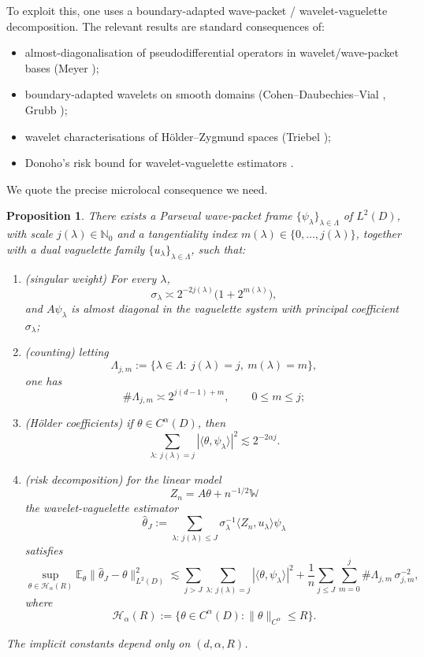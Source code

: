 \documentclass[11pt]{article}
\newtheorem{proposition}[theorem]{Proposition}
\newcommand{\E}{\mathbb E}
\begin{document}
To exploit this, one uses a boundary-adapted wave-packet / wavelet-vaguelette decomposition. The relevant results are standard consequences of:
\begin{itemize}
\item almost-diagonalisation of pseudodifferential operators in wavelet/wave-packet bases (Meyer \cite[Ch.~VI]{Meyer});
\item boundary-adapted wavelets on smooth domains (Cohen--Daubechies--Vial \cite{CDV}, Grubb \cite{Grubb});
\item wavelet characterisations of Hölder--Zygmund spaces (Triebel \cite[Ch.~2]{Triebel});
\item Donoho's risk bound for wavelet-vaguelette estimators \cite{Donoho95}.
\end{itemize}

We quote the precise microlocal consequence we need.

\begin{proposition}\label{prop:wvd}
There exists a Parseval wave-packet frame $\{\psi_\lambda\}_{\lambda\in \Lambda}$ of $L^2(D)$, with scale $j(\lambda)\in \mathbb N_0$ and a tangentiality index $m(\lambda)\in\{0,\dots,j(\lambda)\}$, together with a dual vaguelette family $\{u_\lambda\}_{\lambda\in\Lambda}$, such that:

\begin{enumerate}
\item[\rm(a)] (\emph{singular weight}) For every $\lambda$,
\[
\sigma_\lambda \asymp 2^{-2j(\lambda)}\bigl(1+2^{m(\lambda)}\bigr),
\]
and $A\psi_\lambda$ is almost diagonal in the vaguelette system with principal coefficient $\sigma_\lambda$;

\item[\rm(b)] (\emph{counting}) letting
\[
\Lambda_{j,m}:=\{\lambda\in\Lambda:\ j(\lambda)=j,\ m(\lambda)=m\},
\]
one has
\[
\#\Lambda_{j,m}\asymp 2^{j(d-1)+m},\qquad 0\le m\le j;
\]

\item[\rm(c)] (\emph{Hölder coefficients}) if $\theta\in C^\alpha(D)$, then
\[
\sum_{\lambda:\ j(\lambda)=j} |\langle \theta,\psi_\lambda\rangle|^2 \lesssim 2^{-2\alpha j}.
\]

\item[\rm(d)] (\emph{risk decomposition}) for the linear model
\[
Z_n=A\theta+n^{-1/2}\mathbb W
\]
the wavelet-vaguelette estimator
\[
\hat\theta_J:=\sum_{\lambda:\ j(\lambda)\le J}\sigma_\lambda^{-1}\langle Z_n,u_\lambda\rangle \psi_\lambda
\]
satisfies
\[
\sup_{\theta\in \mathcal H_\alpha(R)}
\E_\theta\|\hat\theta_J-\theta\|_{L^2(D)}^2
\lesssim
\sum_{j>J}\sum_{\lambda:\ j(\lambda)=j} |\langle \theta,\psi_\lambda\rangle|^2
+
\frac1n\sum_{j\le J}\sum_{m=0}^j \#\Lambda_{j,m}\,\sigma_{j,m}^{-2},
\]
where
\[
\mathcal H_\alpha(R):=\{\theta\in C^\alpha(D): \|\theta\|_{C^\alpha}\le R\}.
\]
\end{enumerate}
The implicit constants depend only on $(d,\alpha,R)$.
\end{proposition}
\end{document}
